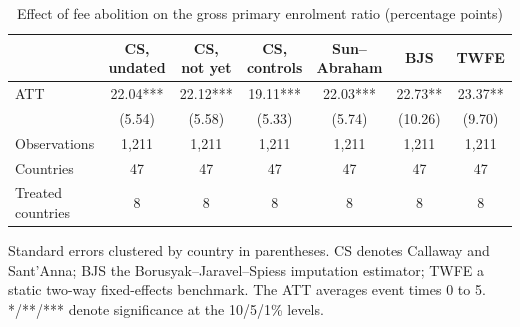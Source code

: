 \begin{table}[t]
\centering
\begin{threeparttable}
\caption{Effect of fee abolition on the gross primary enrolment ratio (percentage points)}
\label{tab:main}
\begin{tabular}{lcccccc}
\toprule
 & CS, undated & CS, not yet & CS, controls & Sun--Abraham & BJS & TWFE \\
\midrule
ATT & 22.04*** & 22.12*** & 19.11*** & 22.03*** & 22.73** & 23.37** \\
 & (5.54) & (5.58) & (5.33) & (5.74) & (10.26) & (9.70) \\
Observations & 1,211 & 1,211 & 1,211 & 1,211 & 1,211 & 1,211 \\
Countries & 47 & 47 & 47 & 47 & 47 & 47 \\
Treated countries & 8 & 8 & 8 & 8 & 8 & 8 \\
\bottomrule
\end{tabular}
\begin{tablenotes}[flushleft]
\footnotesize
\item Standard errors clustered by country in parentheses. CS denotes Callaway and Sant'Anna; BJS the Borusyak--Jaravel--Spiess imputation estimator; TWFE a static two-way fixed-effects benchmark. The ATT averages event times 0 to 5. */**/*** denote significance at the 10/5/1\% levels.
\end{tablenotes}
\end{threeparttable}
\end{table}
